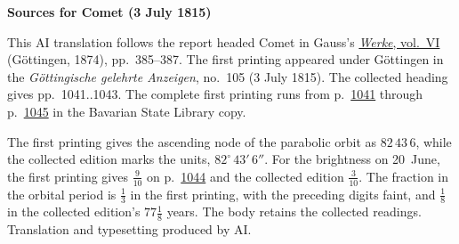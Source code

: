 \clearpage\thispagestyle{empty}
\begin{center}\textbf{Sources for Comet (3 July 1815)}\end{center}
\noindent This AI translation follows the report headed Comet in Gauss’s \href{https://gdz.sub.uni-goettingen.de/id/PPN236007467}{\textit{Werke}, vol.~VI} (Göttingen, 1874), pp.~385--387. The first printing appeared under Göttingen in the \textit{Göttingische gelehrte Anzeigen}, no.~105 (3 July 1815). The collected heading gives pp.~1041..1043. The complete first printing runs from p.~\href{https://api.digitale-sammlungen.de/iiif/image/v2/bsb10538687_00367/full/1600,/0/default.jpg}{1041} through p.~\href{https://api.digitale-sammlungen.de/iiif/image/v2/bsb10538687_00371/full/1600,/0/default.jpg}{1045} in the Bavarian State Library copy.
\par\smallskip\noindent The first printing gives the ascending node of the parabolic orbit as $82\,43\,6$, while the collected edition marks the units, $82^\circ\,43'\,6''$. For the brightness on 20~June, the first printing gives $\frac{9}{10}$ on p.~\href{https://api.digitale-sammlungen.de/iiif/image/v2/bsb10538687_00370/full/1600,/0/default.jpg}{1044} and the collected edition $\frac{3}{10}$. The fraction in the orbital period is $\frac{1}{3}$ in the first printing, with the preceding digits faint, and $\frac{1}{8}$ in the collected edition’s $77\frac{1}{8}$ years. The body retains the collected readings. Translation and typesetting produced by AI.
\clearpage

